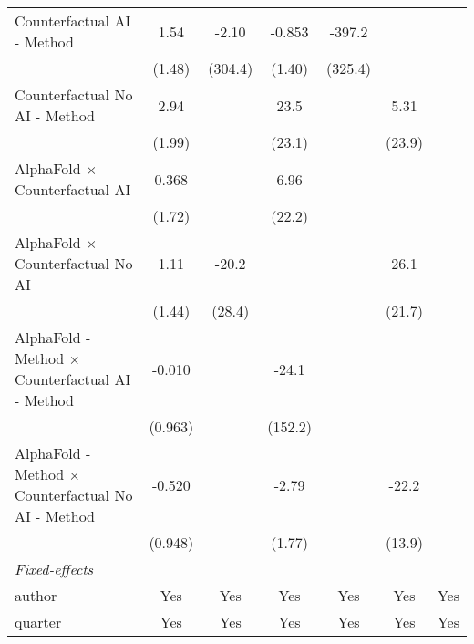 \begin{tabular}{lcccccc}
   Counterfactual AI - Method                                 & 1.54        & -2.10   & -0.853       & -397.2         &             &   \\   
                                                              & (1.48)      & (304.4) & (1.40)       & (325.4)        &             &   \\   
   Counterfactual No AI - Method                              & 2.94        &         & 23.5         &                & 5.31        &   \\   
                                                              & (1.99)      &         & (23.1)       &                & (23.9)      &   \\   
   AlphaFold $\times$ Counterfactual AI                       & 0.368       &         & 6.96         &                &             &   \\   
                                                              & (1.72)      &         & (22.2)       &                &             &   \\   
   AlphaFold $\times$ Counterfactual No AI                    & 1.11        & -20.2   &              &                & 26.1        &   \\   
                                                              & (1.44)      & (28.4)  &              &                & (21.7)      &   \\   
   AlphaFold - Method $\times$ Counterfactual AI - Method     & -0.010      &         & -24.1        &                &             &   \\   
                                                              & (0.963)     &         & (152.2)      &                &             &   \\   
   AlphaFold - Method $\times$ Counterfactual No AI - Method  & -0.520      &         & -2.79        &                & -22.2       &   \\   
                                                              & (0.948)     &         & (1.77)       &                & (13.9)      &   \\   
   \midrule
   \emph{Fixed-effects}\\
   author                                                     & Yes         & Yes     & Yes          & Yes            & Yes         & Yes\\  
   quarter                                                    & Yes         & Yes     & Yes          & Yes            & Yes         & Yes\\  

\end{tabular}
